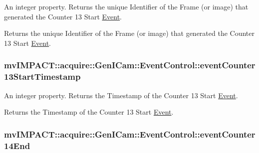 An integer property. Returns the unique Identifier of the Frame (or image) that generated the Counter 13 Start \hyperlink{classmv_i_m_p_a_c_t_1_1acquire_1_1_event}{Event}. 

Returns the unique Identifier of the Frame (or image) that generated the Counter 13 Start \hyperlink{classmv_i_m_p_a_c_t_1_1acquire_1_1_event}{Event}. \hypertarget{classmv_i_m_p_a_c_t_1_1acquire_1_1_gen_i_cam_1_1_event_control_ac7297d79dfc5760f171ec40516882677}{
\subsubsection[{event\+Counter13\+Start\+Timestamp}]{ mv\+I\+M\+P\+A\+C\+T\+::acquire\+::\+Gen\+I\+Cam\+::\+Event\+Control\+::event\+Counter13\+Start\+Timestamp}}\label{classmv_i_m_p_a_c_t_1_1acquire_1_1_gen_i_cam_1_1_event_control_ac7297d79dfc5760f171ec40516882677}


An integer property. Returns the Timestamp of the Counter 13 Start \hyperlink{classmv_i_m_p_a_c_t_1_1acquire_1_1_event}{Event}. 

Returns the Timestamp of the Counter 13 Start \hyperlink{classmv_i_m_p_a_c_t_1_1acquire_1_1_event}{Event}. \hypertarget{classmv_i_m_p_a_c_t_1_1acquire_1_1_gen_i_cam_1_1_event_control_a221547b93f72d8cf3801b3ed0a60d08d}{
\subsubsection[{event\+Counter14\+End}]{ mv\+I\+M\+P\+A\+C\+T\+::acquire\+::\+Gen\+I\+Cam\+::\+Event\+Control\+::event\+Counter14\+End}}\label{classmv_i_m_p_a_c_t_1_1acquire_1_1_gen_i_cam_1_1_event_control_a221547b93f72d8cf3801b3ed0a60d08d}


